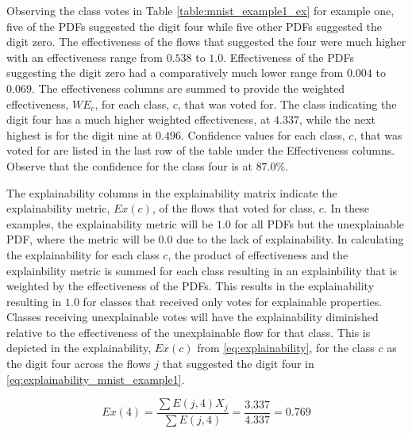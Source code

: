 Observing the class votes in Table \ref{table:mnist_example1_ex} for example
one, five of the PDFs suggested the digit four while five other PDFs suggested
the digit zero.  The effectiveness of the flows that suggested the four were
much higher with an effectiveness range from $0.538$ to $1.0$.  Effectiveness of
the PDFs suggesting the digit zero had a comparatively much lower range from
$0.004$ to $0.069$.  The effectiveness columns are summed to provide the
weighted effectiveness, $WE_c$, for each class, $c$, that was voted for. The
class indicating the digit four has a much higher weighted effectiveness, at
$4.337$, while the next highest is for the digit nine at $0.496$. Confidence
values for each class, $c$, that was voted for are listed in the last row of the
table under the Effectiveness columns. Observe that the confidence for the class
four is at $87.0\%$.

The explainability columns in the explainability matrix indicate the
explainability metric, $Ex(c)$, of the flows that voted for class, $c$.
In these examples, the explainability metric will be $1.0$ for all PDFs but the
unexplainable PDF, where the metric will be $0.0$ due to the lack of
explainability.  In calculating the explainability for each class $c$, the
product of effectiveness and the explainbility metric is summed for each class
resulting in an explainbility that is weighted by the effectiveness of the PDFs.
This results in the explainability resulting in $1.0$ for classes that received
only votes for explainable properties.  Classes receiving unexplainable votes
will have the explainability diminished relative to the effectiveness of the
unexplainable flow for that class.  This is depicted in the explainability,
$Ex(c)$ from \eqref{eq:explainability}, for the class $c$ as the digit four
across the flows $j$ that suggested the digit four in
\eqref{eq:explainability_mnist_example1}.

\begin{equation}\label{eq:explainability_mnist_example1}
    Ex(4)=\frac{\sum{E(j,4)X_j}}{\sum{E(j,4)}} = \frac{3.337}{4.337}=0.769
\end{equation}


